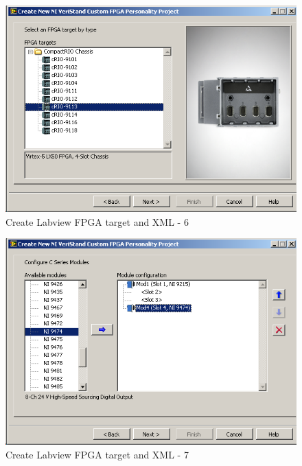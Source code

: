 \documentclass[a4paper,twoside,english]{report}
\begin{document}
\begin{figure}[!h]
\centering \includegraphics[scale=0.45]{Screenshots/Screenshot_2015-01-16_19-24-43.png}
\caption{Create Labview FPGA target and XML - 6}

\label{fig: Create Labview FPGA target and XML-6} 
\end{figure}

\begin{figure}[!h]
\centering \includegraphics[scale=0.45]{Screenshots/Screenshot_2015-01-16_19-25-37.png}
\caption{Create Labview FPGA target and XML - 7}

\label{fig: Create Labview FPGA target and XML-7} 
\end{figure}
\end{document}
